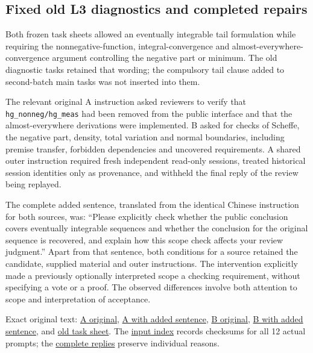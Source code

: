 \subsection[Fixed old L3 diagnostics and completed repairs]{\texorpdfstring{\protect\hypertarget{q4}{}Fixed old L3 diagnostics and completed repairs}{Fixed old L3 diagnostics and completed repairs}}
Both frozen task sheets allowed an eventually integrable tail formulation while requiring the nonnegative-function, integral-convergence and almost-everywhere-convergence argument controlling the negative part or minimum. The old diagnostic tasks retained that wording; the compulsory tail clause added to second-batch main tasks was not inserted into them.

The relevant original A instruction asked reviewers to verify that \nolinkurl{hg_nonneg/hg_meas} had been removed from the public interface and that the almost-everywhere derivations were implemented. B asked for checks of Scheffe, the negative part, density, total variation and normal boundaries, including premise transfer, forbidden dependencies and uncovered requirements. A shared outer instruction required fresh independent read-only sessions, treated historical session identities only as provenance, and withheld the final reply of the review being replayed.

The complete added sentence, translated from the identical Chinese instruction for both sources, was: “Please explicitly check whether the public conclusion covers eventually integrable sequences and whether the conclusion for the original sequence is recovered, and explain how this scope check affects your review judgment.” Apart from that sentence, both conditions for a source retained the candidate, supplied material and outer instructions. The intervention explicitly made a previously optionally interpreted scope a checking requirement, without specifying a vote or a proof. The observed differences involve both attention to scope and interpretation of acceptance.

Exact original text: \href{verification/revision23/diagnostic_inputs/A-condition_original.txt}{A original}, \href{verification/revision23/diagnostic_inputs/A-condition_scope.txt}{A with added sentence}, \href{verification/revision23/diagnostic_inputs/B-condition_original.txt}{B original}, \href{verification/revision23/diagnostic_inputs/B-condition_scope.txt}{B with added sentence}, and \href{verification/revision23/diagnostic_inputs/A-TASK.zh-CN.md}{old task sheet}. The \href{verification/revision23/diagnostic_inputs/SOURCE_INDEX.json}{input index} records checksums for all 12 actual prompts; the \href{verification/revision23/analysis/L3_DIAGNOSTIC_OUTPUTS.md}{complete replies} preserve individual reasons.

